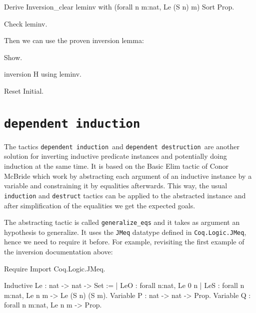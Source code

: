 \begin{coq_example*}
\begin{coq_example*}
Derive Inversion_clear leminv with (forall n m:nat, Le (S n) m) Sort
 Prop.
\end{coq_example*}

\begin{coq_example}
Check leminv.
\end{coq_example}

Then we can use the proven inversion lemma:

\begin{coq_example}
Show.
\end{coq_example}

\begin{coq_example}
inversion H using leminv.
\end{coq_example}

\begin{coq_eval}
Reset Initial.
\end{coq_eval}

\section[\tt dependent induction]{\tt dependent induction\label{dependent-induction-example}}
\def\depind{{\tt dependent induction}~}
\def\depdestr{{\tt dependent destruction}~}

The tactics \depind and \depdestr are another solution for inverting
inductive predicate instances and potentially doing induction at the
same time. It is based on the Basic Elim tactic of Conor McBride which
work by abstracting each argument of an inductive instance by a variable
and constraining it by equalities afterwards. This way, the usual 
{\tt induction} and {\tt destruct} tactics can be applied to the
abstracted instance and after simplification of the equalities we get
the expected goals.

The abstracting tactic is called {\tt generalize\_eqs} and it takes as
argument an hypothesis to generalize. It uses the {\tt JMeq} datatype
defined in {\tt Coq.Logic.JMeq}, hence we need to require it before.
For example, revisiting the first example of the inversion documentation above:

\begin{coq_example*}
Require Import Coq.Logic.JMeq.
\end{coq_example*}

\begin{coq_eval}
Inductive Le : nat -> nat -> Set :=
  | LeO : forall n:nat, Le 0 n
  | LeS : forall n m:nat, Le n m -> Le (S n) (S m).
Variable P : nat -> nat -> Prop.
Variable Q : forall n m:nat, Le n m -> Prop.
\end{coq_eval}


\end{coq_example*}
